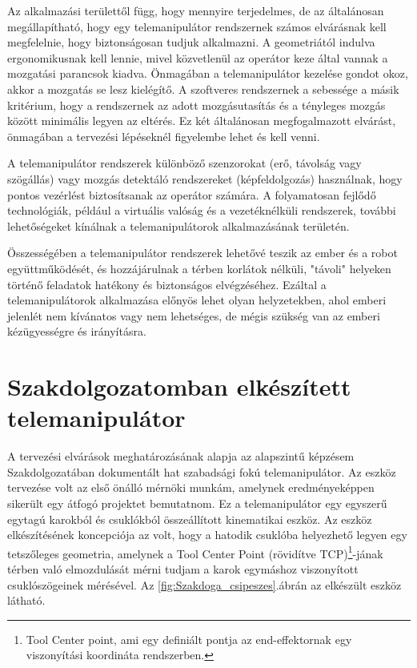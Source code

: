 Az alkalmazási területtől függ, hogy mennyire terjedelmes, de az általánosan megállapítható, hogy egy telemanipulátor rendszernek számos elvárásnak kell megfelelnie, hogy biztonságosan tudjuk alkalmazni. A geometriától indulva ergonomikusnak kell lennie, mivel közvetlenül az operátor keze által vannak a mozgatási parancsok kiadva. Önmagában a telemanipulátor kezelése gondot okoz, akkor a mozgatás se lesz kielégítő. A szoftveres rendszernek a sebessége a másik kritérium, hogy a rendszernek az adott mozgásutasítás és a tényleges mozgás között minimális legyen az eltérés. Ez két általánosan megfogalmazott elvárást, önmagában a tervezési lépéseknél figyelembe lehet és kell venni.

A telemanipulátor rendszerek különböző szenzorokat (erő, távolság vagy szögállás) vagy mozgás detektáló rendszereket (képfeldolgozás) használnak, hogy pontos vezérlést biztosítsanak az operátor számára. A folyamatosan fejlődő technológiák, például a virtuális valóság és a vezetéknélküli rendszerek, további lehetőségeket kínálnak a telemanipulátorok alkalmazásának területén.

Összességében a telemanipulátor rendszerek lehetővé teszik az ember és a robot együttműködését, és hozzájárulnak a térben korlátok nélküli, "távoli" helyeken történő feladatok hatékony és biztonságos elvégzéséhez. Ezáltal a telemanipulátorok alkalmazása előnyös lehet olyan helyzetekben, ahol emberi jelenlét nem kívánatos vagy nem lehetséges, de mégis szükség van az emberi kézügyességre és irányításra.

\section{Szakdolgozatomban elkészített telemanipulátor}

A tervezési elvárások meghatározásának alapja az alapszintű képzésem Szakdolgozatában dokumentált hat szabadsági fokú telemanipulátor. Az eszköz tervezése volt az első önálló mérnöki munkám, amelynek eredményeképpen sikerült egy átfogó projektet bemutatnom. Ez a telemanipulátor egy egyszerű egytagú karokból és csuklókból összeállított kinematikai eszköz. Az eszköz elkészítésének koncepciója az volt, hogy a hatodik csuklóba helyezhető legyen egy tetszőleges geometria, amelynek a Tool Center Point (rövidítve TCP)\footnote{Tool Center point, ami egy definiált pontja az end-effektornak egy viszonyítási koordináta rendszerben.}-jának térben való elmozdulását mérni tudjam a karok egymáshoz viszonyított csuklószögeinek mérésével. Az \ref{fig:Szakdoga_csipeszes}.ábrán az elkészült eszköz látható.\cite{szakdoga}

